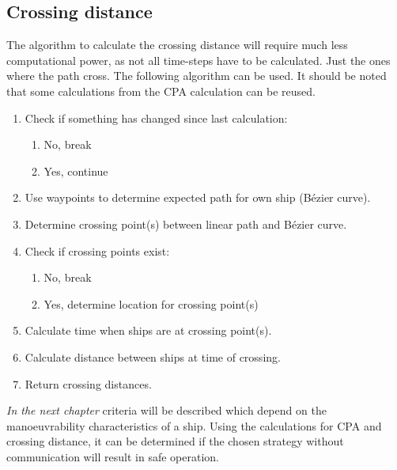\subsection{Crossing distance}
The algorithm to calculate the crossing distance will require much less computational power, as not all time-steps have to be calculated. Just the ones where the path cross. The following algorithm can be used. It should be noted that some calculations from the CPA calculation can be reused.
\begin{enumerate}
	\item Check if something has changed since last calculation:
	\begin{enumerate}
		\item No, break
		\item Yes, continue
	\end{enumerate}
	\item Use waypoints to determine expected path for own ship (Bézier curve).
	\item Determine crossing point(s) between linear path and Bézier curve.
	\item Check if crossing points exist:
	\begin{enumerate}
		\item No, break
		\item Yes, determine location for crossing point(s)
	\end{enumerate}
	\item Calculate time when ships are at crossing point(s).
	\item Calculate distance between ships at time of crossing.
	\item Return crossing distances.
\end{enumerate}

\vspace{1.5cm}
\emph{In the next chapter} criteria will be described which depend on the manoeuvrability characteristics of a ship. Using the calculations for \ac{CPA} and crossing distance, it can be determined if the chosen strategy without communication will result in safe operation.













